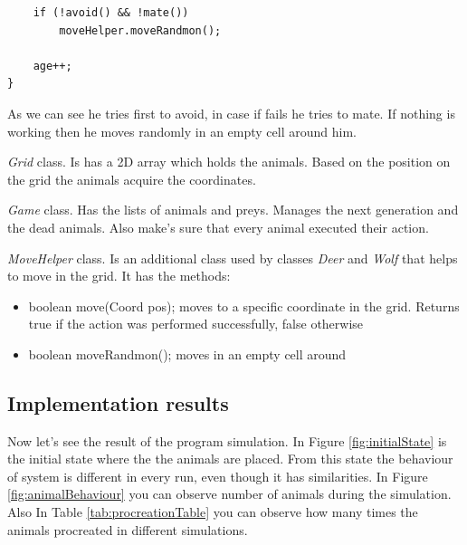 \documentclass[11pt]{article}
\begin{document}
\begin{description}
\begin{lstlisting}
	if (!avoid() && !mate())
		moveHelper.moveRandmon();
	
	age++;
}
\end{lstlisting}
As we can see he tries first to avoid, in case if fails he tries to mate. If nothing is working then he moves randomly in an empty cell around him.

\item
\emph{Grid} class. Is has a 2D array which holds the animals. Based on the position on the grid the animals acquire the coordinates.

\item
\emph{Game} class. Has the lists of animals and preys. Manages the next generation and the dead animals. Also make's sure that every animal executed their action.
\item
\emph{MoveHelper} class. Is an additional class used by classes \emph{Deer} and \emph{Wolf} that helps to move in the grid. It has the methods:
	\begin{itemize}
	\item
	{\ttfamily boolean move(Coord pos);} moves to a specific coordinate in the grid. Returns true if the action was performed successfully, false otherwise
	\item
	{\ttfamily boolean moveRandmon();} moves in an empty cell around
	\end{itemize}

\end{description}

\newpage
\subsection*{Implementation results}
Now let's see the result of the program simulation. In Figure \ref{fig:initialState} is the initial state where the the animals are placed. From this state the behaviour of system is different in every run, even though it has similarities. In Figure \ref{fig:animalBehaviour} you can observe number of animals during the simulation. Also In Table \ref{tab:procreationTable} you can observe how many times the animals procreated in different simulations.
\end{document}
